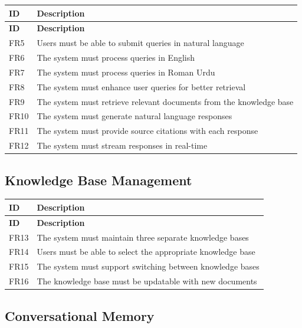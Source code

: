 \documentclass[12pt,a4paper]{book}
\numberwithin{table}{chapter}
\numberwithin{figure}{chapter}
\numberwithin{equation}{chapter}
\begin{document}
\begin{longtable}{|p{0.5in}|p{4in}|}
\hline
\textbf{ID} & \textbf{Description}\\
\hline
\endfirsthead
\hline
\textbf{ID} & \textbf{Description}\\
\hline
\endhead
\hline
FR5 & Users must be able to submit queries in natural language\\
\hline
FR6 & The system must process queries in English\\
\hline
FR7 & The system must process queries in Roman Urdu\\
\hline
FR8 & The system must enhance user queries for better retrieval\\
\hline
FR9 & The system must retrieve relevant documents from the knowledge base\\
\hline
FR10 & The system must generate natural language responses\\
\hline
FR11 & The system must provide source citations with each response\\
\hline
FR12 & The system must stream responses in real-time\\
\hline
\end{longtable}

\subsection{Knowledge Base Management}

\begin{longtable}{|p{0.5in}|p{4in}|}
\hline
\textbf{ID} & \textbf{Description}\\
\hline
\endfirsthead
\hline
\textbf{ID} & \textbf{Description}\\
\hline
\endhead
\hline
FR13 & The system must maintain three separate knowledge bases\\
\hline
FR14 & Users must be able to select the appropriate knowledge base\\
\hline
FR15 & The system must support switching between knowledge bases\\
\hline
FR16 & The knowledge base must be updatable with new documents\\
\hline
\end{longtable}

\subsection{Conversational Memory}
\end{document}
